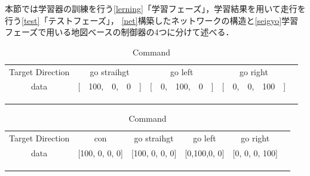 本節では学習器の訓練を行う\ref{lerning}「学習フェーズ」，学習結果を用いて走行を行う\ref{test}「テストフェーズ」，
\ref{net}構築したネットワークの構造と\ref{seigyo}学習フェーズで用いる地図べースの制御器の4つに分けて述べる．
\vspace{2.0zh}
\begin{table}[h]
    \centering
    \caption{Command}
    \begin{tabular}{cccll}
    \cline{1-4}
    \multicolumn{1}{|c|}{Target Direction} & \multicolumn{1}{c|}{go straihgt}          & \multicolumn{1}{c|}{go left}          & \multicolumn{1}{c|}{go right}          &  \\ \cline{1-4}
    \multicolumn{1}{|c|}{data}  & \multicolumn{1}{c|}{{[}　100,　0,　0　{]}} & \multicolumn{1}{c|}{{[}　0,　100,　0　{]}} & \multicolumn{1}{l|}{{[}　0,　0,　100　{]}} &  \\ \cline{1-4}
                               &                                  &                                  &                                  &  \\
                               &                                  &                                  &                                  &  \\
    \multicolumn{1}{l}{}       &                                  &                                  &                                  & 
    \end{tabular}
    \vspace{-3.0zh}
    \label{tb:comman}
    \end{table}
  
    \begin{table}[h]
      \centering
      \caption{Command}
      \begin{tabular}{ccccll}
      \cline{1-5}
      \multicolumn{1}{|c|}{Target Direction} & \multicolumn{1}{c|}{con}&\multicolumn{1}{c|}{go straihgt}          & \multicolumn{1}{c|}{go left}          & \multicolumn{1}{c|}{go right}          &  \\ \cline{1-5}
      \multicolumn{1}{|c|}{data}  &\multicolumn{1}{c|}{{[}100, 0, 0, 0{]}}& \multicolumn{1}{c|}{{[}100, 0, 0, 0{]}} & \multicolumn{1}{c|}{{[}0,100,0, 0{]}} & \multicolumn{1}{l|}{{[}0, 0, 0, 100{]}} &  \\ \cline{1-5}
                                 &                                  &                                  &                                  &  \\
                                 &                                  &                                  &                                  &  \\
      \multicolumn{1}{l}{}       &                                  &                                  &                                  & 
      \end{tabular}
      \vspace{-3.0zh}
      \label{tb:command_4}
      \end{table}
  
